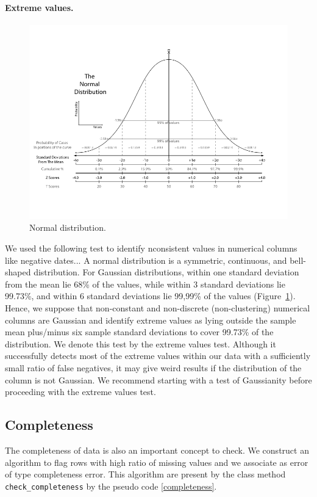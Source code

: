 \documentclass{article}
\begin{document}
\paragraph{Extreme values.} %
\label{sub:Extreme values}
\begin{figure}[h]
    \centering
    \includegraphics[width=0.6\linewidth]{picture/normal.png}
    \caption{Normal distribution.}
    \label{fig:normal distribution}
\end{figure}
We used the following test to identify nconsistent values in numerical columns like negative dates...
A normal distribution is a symmetric, continuous, and  bell-shaped distribution.
For Gaussian distributions, within one standard deviation from the mean lie 68\% of the values, while within 3 standard deviations lie 99.73\%, and within 6 standard deviations lie 99,99\% of the values (Figure~\ref{fig:normal distribution}).
Hence, we suppose that non-constant and non-discrete (non-clustering) numerical columns are Gaussian and identify extreme values as lying outside the sample mean plus/minus six sample standard deviations to cover 99.73\% of the distribution.
We denote this test by the extreme values test.
Although it successfully detects most of the extreme values within our data with a sufficiently small ratio of false negatives, it may give weird results if the distribution of the column is not Gaussian.
We recommend starting with a test of Gaussianity before proceeding with the extreme values test.

\subsection{Completeness} %
\label{sub:Completeness}
The completeness of data is also an important concept to check. We construct an algorithm to flag rows with high ratio of missing values and we associate as error of type completeness error. This algorithm are present by the class method \texttt{check\_completeness} by the pseudo code \ref{completeness}.
\end{document}
